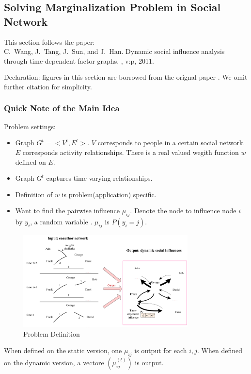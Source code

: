 \documentclass[11pt,a4paper]{article}
\begin{document}
\subsection{Solving Marginalization Problem in Social Network}
This section follows the paper:\\
C.~Wang, J.~Tang, J.~Sun, and J.~Han.
\newblock Dynamic social influence analysis through time-dependent factor
  graphs.
, v:p, 2011.

Declaration: figures in this section are borrowed from the orignal paper
\cite{wang2011-dynamic}. 
We omit further citation for simplicity. 

\subsubsection{Quick Note of the Main Idea}

Problem settings:
\begin{itemize}
	\item Graph $G^t=<V^t,E^t>$. $V$ corresponds to people in a certain 
	social network. $E$ corresponds activity relationships. There is 
	a real valued wegith function $w$ defined on $E$. 
	\item Graph $G^t$ captures time varying relationships. 
	\item Definition of $w$ is problem(application) specific. 
	\item Want to find the pairwise influence $\mu_{ij}$. Denote 
	the node to influence node $i$ by $y_i$, a random variable . 
	$\mu_{ij}$ is $P(y_i=j)$. 
\end{itemize}

\begin{figure}[htb]
\centering
	\includegraphics[width=0.8\textwidth]{fig/wang2011-problem.png}
	\caption{Problem Definition}
\end{figure}

When defined on the static version, one $\mu_{ij}$ is output for 
each $i,j$. When defined on the dynamic version, a vectore
$(\mu^{(t)}_{ij})$ is output. 
\end{document}
